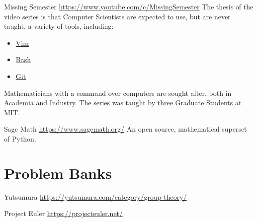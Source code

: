 %
\begin{boxResource}{Missing Semester}
\url{https://www.youtube.com/c/MissingSemester}
\tcblower
The thesis of the video series is that Computer Scientists are expected to use,
    but are never taught,
    a variety of tools,
    including:
\begin{itemize}
    \item \href{https://www.youtube.com/watch?v=a6Q8Na575qc}{Vim}
    \item \href{https://www.youtube.com/watch?v=Z56Jmr9Z34Q}{Bash}
    \item \href{https://www.youtube.com/watch?v=2sjqTHE0zok}{Git}
\end{itemize}
Mathematicians with a command over computers are sought after, both in Academia and Industry.
The series was taught by three Graduate Students at MIT.
\end{boxResource}
%
\begin{boxResource}{Sage Math}
\url{https://www.sagemath.org/}
\tcblower
An open source, mathematical superset of Python.
\end{boxResource}
%
\section{Problem Banks}
\begin{boxResource}{Yutsumura}
\url{https://yutsumura.com/category/group-theory/}
\end{boxResource}
%
\begin{boxResource}{Project Euler}
\url{https://projecteuler.net/}
\end{boxResource}
